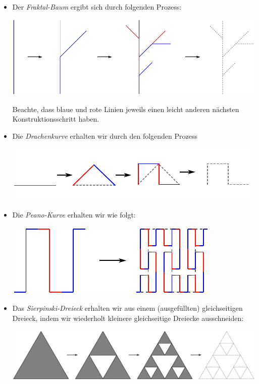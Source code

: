 \documentclass[a4paper,ngerman,12pt]{scrartcl}
\theoremstyle{definition}
\theoremstyle{plain}
\theoremstyle{remark}
\begin{document}
\begin{itemize}
	\item Der \emph{Fraktal-Baum} ergibt sich durch folgenden Prozess:
		\begin{center}
			\includegraphics[width=.7\textwidth]{Bilder/Baum-Konstruktion.pdf}
		\end{center}
		Beachte, dass blaue und rote Linien jeweils einen leicht anderen nächsten Konstruktionsschritt haben.
		
	\item Die \emph{Drachenkurve} erhalten wir durch den folgenden Prozess
		\begin{center}
			\includegraphics[width=.7\textwidth]{Bilder/Drachenkurve_Konstruktion.pdf}
		\end{center}
	
	\item Die \emph{Peano-Kurve} erhalten wir wie folgt:
		\begin{center}
			\includegraphics[width=.5\textwidth]{Bilder/Peano-Konstruktion.pdf}
		\end{center}
	
	\item Das \emph{Sierpinski-Dreieck} erhalten wir aus einem (ausgefüllten) gleichseitigen Dreieck, indem wir wiederholt kleinere gleichseitige Dreiecke ausschneiden:
		\begin{center}
			\includegraphics[width=.7\textwidth]{Bilder/Sierpinski-Konstruktion.pdf}
		\end{center}
	

\end{itemize}
\end{document}

